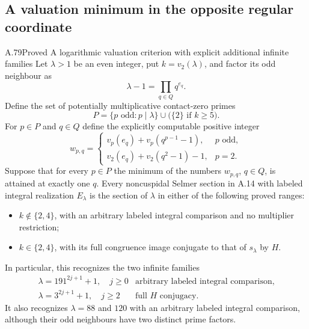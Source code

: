 \subsection{A valuation minimum in the opposite regular coordinate}

\begin{statement}{A.79}{Proved}
{A logarithmic valuation criterion with explicit additional infinite families}
Let $\lambda>1$ be an even integer, put $k=v_2(\lambda)$,
and factor its odd neighbour as
\[
               \lambda-1=\prod_{q\in Q}q^{e_q}.
\tag{A.79.1}
\]
Define the set of potentially multiplicative contact-zero primes
\[
 P=\{p\text{ odd}:p\mid\lambda\}
                       \cup\bigl(\{2\}\text{ if }k\ge5\bigr).
\tag{A.79.2}
\]
For $p\in P$ and $q\in Q$ define the explicitly computable
positive integer
\[
 w_{p,q}=
 \begin{cases}
 v_p(e_q)+v_p(q^{p-1}-1),&p\text{ odd},\\
 v_2(e_q)+v_2(q^2-1)-1,&p=2.
 \end{cases}
\tag{A.79.3}
\]
Suppose that for every $p\in P$ the minimum of the numbers
$w_{p,q}$, $q\in Q$, is attained at exactly one $q$.
Every noncuspidal Selmer section in A.14 with labeled integral
realization $E_\lambda$ is the section of $\lambda$ in either
of the following proved ranges:
\begin{itemize}
\item $k\notin\{2,4\}$, with an arbitrary labeled integral
comparison and no multiplier restriction;
\item $k\in\{2,4\}$, with its full congruence image conjugate
to that of $s_\lambda$ by $H$.
\end{itemize}
In particular, this recognizes the two infinite families
\[
 \begin{array}{c|c}
 \lambda=191^{2j+1}+1,\quad j\ge0
       &\text{arbitrary labeled integral comparison},\\
 \lambda=3^{2j+1}+1,\quad j\ge2
       &\text{full }H\text{ conjugacy}.
 \end{array}
\tag{A.79.4}
\]
It also recognizes $\lambda=88$ and $120$ with an arbitrary
labeled integral comparison, although their odd neighbours
have two distinct prime factors.
\end{statement}
